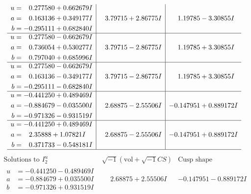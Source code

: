 \documentclass[1p]{elsarticle_modified}
\theoremstyle{definition}
\newcommand{\I}{\sqrt{-1}}
\begin{document}
$$\begin{array}{c|c|c}
\begin{aligned}
u &= \phantom{-}0.277580 + 0.662679 I \\
a &= \phantom{-}0.163136 + 0.349177 I \\
b &= -0.295111 + 0.682840 I\end{aligned}
 & \phantom{-}3.79715 + 2.86775 I & \phantom{-}1.19785 - 3.30855 I \\ \hline\begin{aligned}
u &= \phantom{-}0.277580 - 0.662679 I \\
a &= \phantom{-}0.736054 + 0.530277 I \\
b &= \phantom{-}0.797040 + 0.685996 I\end{aligned}
 & \phantom{-}3.79715 - 2.86775 I & \phantom{-}1.19785 + 3.30855 I \\ \hline\begin{aligned}
u &= \phantom{-}0.277580 - 0.662679 I \\
a &= \phantom{-}0.163136 - 0.349177 I \\
b &= -0.295111 - 0.682840 I\end{aligned}
 & \phantom{-}3.79715 - 2.86775 I & \phantom{-}1.19785 + 3.30855 I \\ \hline\begin{aligned}
u &= -0.441250 + 0.489469 I \\
a &= -0.884679 - 0.035500 I \\
b &= -0.971326 - 0.931519 I\end{aligned}
 & \phantom{-}2.68875 - 2.55506 I & -0.147951 + 0.889172 I \\ \hline\begin{aligned}
u &= -0.441250 + 0.489469 I \\
a &= \phantom{-}2.35888 + 1.07821 I \\
b &= \phantom{-}0.371733 - 0.548181 I\end{aligned}
 & \phantom{-}2.68875 - 2.55506 I & -0.147951 + 0.889172 I\\
 \hline 
 \end{array}$$\newpage$$\begin{array}{c|c|c}  
\text{Solutions to }I^u_{2}& \I (\text{vol} + \sqrt{-1}CS) & \text{Cusp shape}\\
 \hline 
\begin{aligned}
u &= -0.441250 - 0.489469 I \\
a &= -0.884679 + 0.035500 I \\
b &= -0.971326 + 0.931519 I\end{aligned}
 & \phantom{-}2.68875 + 2.55506 I & -0.147951 - 0.889172 I \\ \hline\begin{aligned}

\end{aligned}
\end{array}$$
\end{document}
